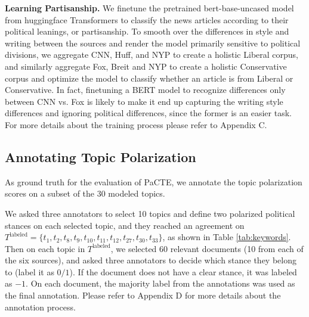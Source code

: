 \documentclass[11pt]{article}
\begin{document}
\begin{table}[ht]
    \caption{The keywords of topics discussed in the paper and two political stances of 10 labeled topics. The indices of labeled topics are highlighted in bold.}
    \label{tab:keywords}
\end{table}


\textbf{Learning Partisanship.}
We finetune the pretrained bert-base-uncased model from huggingface Transformers \cite{wolf2020transformers} to classify the news articles according to their political leanings, or partisanship. To smooth over the differences in style and writing between the sources and render the model primarily sensitive to political divisions, we aggregate CNN, Huff, and NYP to create a holistic Liberal corpus, and similarly aggregate Fox, Breit and NYP to create a holistic Conservative corpus and optimize the model to classify whether an article is from Liberal or Conservative.
In fact, finetuning a BERT model to recognize differences only between CNN vs. Fox is likely to make it end up capturing the writing style differences and ignoring political differences, since the former is an easier task. For more details about the training process please refer to Appendix C.

\subsection{Annotating Topic Polarization}
\label{sec:annotation}
As ground truth for the evaluation of PaCTE, we annotate the topic polarization scores on a subset of the 30 modeled topics. 

We asked three annotators to select 10 topics and define two polarized political stances on each selected topic, and they reached an agreement on $T^{\text{labeled}}=\{t_1,t_2,t_8,t_9,t_{10},t_{11},t_{12},t_{27},t_{30},t_{33}\}$, as shown in Table \ref{tab:keywords}. Then on each topic in $T^{\text{labeled}}$, we selected 60 relevant documents (10 from each of the six sources), and asked three annotators to decide which stance they belong to (label it as $0/1$). If the document does not have a clear stance, it was labeled as $-1$. On each document, the majority label from the annotations was used as the final annotation. Please refer to Appendix D for more details about the annotation process.
\end{document}
